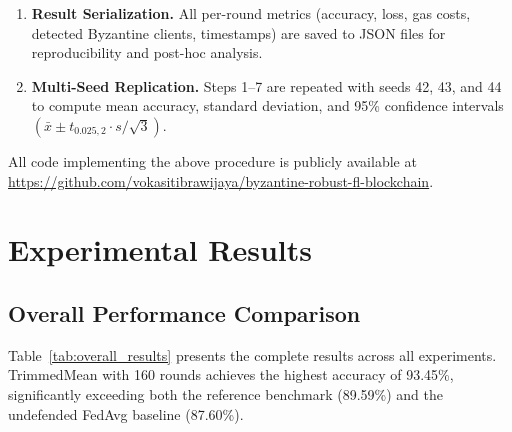 \documentclass[12pt,a4paper,onecolumn]{article}
\begin{document}
\begin{enumerate}
\begin{enumerate}
        \item \textbf{Global Model Update:} The server updates the global model: $\mathbf{w}_{t+1} = \mathbf{w}_t + \text{Aggregate}(\{\Delta \mathbf{w}_i\})$.
        \item \textbf{Round Completion:} The server calls \texttt{completeRound(aggregatedHash)} on-chain, storing the SHA-256 hash of the aggregated model.
        \item \textbf{Evaluation:} The updated global model is evaluated on the full test set (10,000 images). Test accuracy and cross-entropy loss are recorded.
    \end{enumerate}
    
    \item \textbf{Result Serialization.} All per-round metrics (accuracy, loss, gas costs, detected Byzantine clients, timestamps) are saved to JSON files for reproducibility and post-hoc analysis.
    
    \item \textbf{Multi-Seed Replication.} Steps 1--7 are repeated with seeds 42, 43, and 44 to compute mean accuracy, standard deviation, and 95\% confidence intervals $(\bar{x} \pm t_{0.025,2} \cdot s / \sqrt{3})$.
\end{enumerate}

All code implementing the above procedure is publicly available at \url{https://github.com/vokasitibrawijaya/byzantine-robust-fl-blockchain}.

\section{Experimental Results}
\label{sec:results}

\subsection{Overall Performance Comparison}

Table~\ref{tab:overall_results} presents the complete results across all experiments. TrimmedMean with 160 rounds achieves the highest accuracy of 93.45\%, significantly exceeding both the reference benchmark (89.59\%) and the undefended FedAvg baseline (87.60\%).
\end{document}
